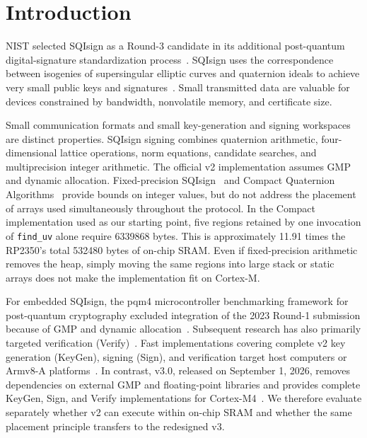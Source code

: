 \documentclass[a4paper,10pt]{article}
\theoremstyle{definition}
\theoremstyle{remark}
\begin{document}
\section{Introduction}
\label{sec:introduction}

NIST selected SQIsign as a Round-3 candidate in its additional post-quantum digital-signature standardization process~\cite{nist-ir-8610,nist-round3}. SQIsign uses the correspondence between isogenies of supersingular elliptic curves and quaternion ideals to achieve very small public keys and signatures~\cite{sqisign-2020,sqisign-spec-v201,sqisign-spec-v3}. Small transmitted data are valuable for devices constrained by bandwidth, nonvolatile memory, and certificate size.

Small communication formats and small key-generation and signing workspaces are distinct properties. SQIsign signing combines quaternion arithmetic, four-dimensional lattice operations, norm equations, candidate searches, and multiprecision integer arithmetic. The official v2 implementation assumes GMP and dynamic allocation. Fixed-precision SQIsign~\cite{fixed-precision-2025} and Compact Quaternion Algorithms~\cite{compact-quaternion-2026} provide bounds on integer values, but do not address the placement of arrays used simultaneously throughout the protocol. In the Compact implementation used as our starting point, five regions retained by one invocation of \texttt{find\_uv} alone require \num{6339868} bytes. This is approximately \num{11.91} times the RP2350's total \num{532480} bytes of on-chip SRAM. Even if fixed-precision arithmetic removes the heap, simply moving the same regions into large stack or static arrays does not make the implementation fit on Cortex-M.

For embedded SQIsign, the pqm4 microcontroller benchmarking framework for post-quantum cryptography excluded integration of the 2023 Round-1 submission because of GMP and dynamic allocation~\cite{pqm4-2024}. Subsequent research has also primarily targeted verification (Verify)~\cite{m4-modarith-2025,sqisign-1d-2024}. Fast implementations covering complete v2 key generation (KeyGen), signing (Sign), and verification target host computers or Armv8-A platforms~\cite{sqisign-arm-2026}. In contrast, v3.0, released on September 1, 2026, removes dependencies on external GMP and floating-point libraries and provides complete KeyGen, Sign, and Verify implementations for Cortex-M4~\cite{sqisign-spec-v3,sqisign-code-v3}. We therefore evaluate separately whether v2 can execute within on-chip SRAM and whether the same placement principle transfers to the redesigned v3.
\end{document}

